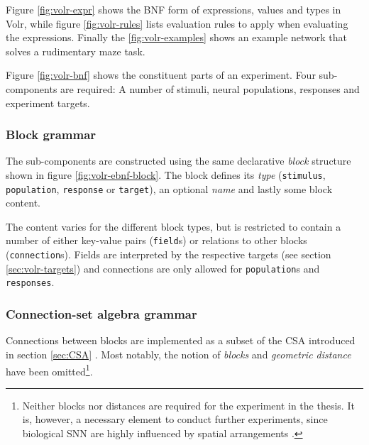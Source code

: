 \documentclass{report.tex}{subfiles}
\begin{document}
Figure \ref{fig:volr-expr} shows the BNF form of expressions, values and types
in Volr, while figure \ref{fig:volr-rules} lists evaluation rules to apply
when evaluating the expressions.
Finally the \ref{fig:volr-examples} shows an example network that solves
a rudimentary maze task.




\newpage\null\thispagestyle{empty}\newpage
\newpage\null\thispagestyle{empty}\newpage
\pagebreak
Figure \ref{fig:volr-bnf} shows the constituent parts of an experiment.
Four sub-com\-po\-nents are required:
  A number of stimuli, neural populations, responses and experiment targets.

\subsubsection{Block grammar} \label{sec:volr-block}
The sub-components are constructed using the same declarative \textit{block}
structure shown in figure \ref{fig:volr-ebnf-block}.
The block defines its \textit{type} (\texttt{stimulus}, \texttt{population},
\texttt{response} or \texttt{target}), an optional \textit{name} and lastly
some block content.

The content varies for the different block types, but is restricted to contain
a number of either key-value pairs (\texttt{field}s) or relations to other
blocks (\texttt{connection}s).
Fields are interpreted by the respective targets (see section
\ref{sec:volr-targets}) and connections are only allowed for
\texttt{population}s and \texttt{responses}.

\subsubsection{Connection-set algebra grammar} \label{sec:volr-csa}
Connections between blocks are implemented as a subset of the \gls{CSA}
introduced in section \ref{sec:CSA} \autocite{Djurfeldt2012}.
Most notably, the notion of \textit{blocks} and \textit{geometric distance} have
been omitted\footnote{Neither blocks nor distances are required for the
  experiment in the thesis. It is, however, a necessary element to conduct
  further experiments, since biological \gls{SNN} are highly influenced by
  spatial arrangements \autocite{dayan2001}.
}.
\end{document}
